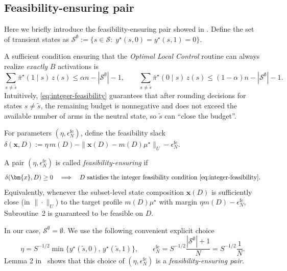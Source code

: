 \documentclass[mnsc,nonblindrev]{informs3}
\newcommand{\bmx}{\bm{x}}
\newcommand{\States}{\mathcal{S}}
\newcommand{\enfe}{\epsilon_N^{\mathrm{fe}}}
\begin{document}
\begin{APPENDICES}
\subsection{Feasibility-ensuring pair}
Here we briefly introduce the feasibility-ensuring pair showed in \citet{hong2024achieving}. Define the set of transient states as
$
\mathcal S^{\emptyset}:=\{s\in\mathcal S:\; y^\star(s,0)=y^\star(s,1)=0\}.
$

A sufficient condition ensuring that the \emph{Optimal Local Control} routine can always realize \emph{exactly} $B$ activations is
\begin{equation}\label{eq:integer-feasibility}
\sum_{s\neq \tilde s}\bar\pi^\star(1\mid s)\,z(s)\le \alpha n-|\mathcal S^{\emptyset}|-1,
\qquad
\sum_{s\neq \tilde s}\bar\pi^\star(0\mid s)\,z(s)\le (1-\alpha)n-|\mathcal S^{\emptyset}|-1.
\end{equation}
Intuitively, \eqref{eq:integer-feasibility} guarantees that after rounding decisions for states
$s\neq \tilde s$, the remaining budget is nonnegative and does not exceed the available number of arms in the neutral state, so $\tilde s$ can ``close the budget''.

For parameters $(\eta,\enfe)$, define the feasibility slack
$
    \delta(\bmx,D):=\eta\,m(D)-\|\bmx(D)-m(D)\mu^\star\|_U-\enfe.
$

\begin{definition}\label{def:fe-pair}
A pair $(\eta,\enfe)$ is called \emph{feasibility-ensuring} if 
\begin{equation*}%
    \delta(\bmx,D)\ge 0
    \quad\Longrightarrow\quad
    \text{$D$ satisfies the integer feasibility condition \eqref{eq:integer-feasibility}.}
\end{equation*}
Equivalently, whenever the subset-level state composition $\bmx(D)$ is sufficiently close (in $\|\cdot\|_U$)
to the target profile $m(D)\mu^\star$ with margin $\eta m(D)-\enfe$, Subroutine~2 is guaranteed
to be feasible on $D$.
\end{definition}
In our case, $\States^{\emptyset}=\emptyset$. We use the following convenient explicit choice 
\begin{equation}\label{eq:explicit-fe-pair}
\eta = S^{-1/2}\min\{y^\star(\tilde s,0),\,y^\star(\tilde s,1)\},
\qquad
\enfe = S^{-1/2}\frac{|\mathcal S^{\emptyset}|+1}{N}=S^{-1/2}\frac{1}{N}.
\end{equation}
Lemma 2 in~\citet{hong2024achieving} shows that this choice of $(\eta,\enfe)$ is a \emph{feasibility-ensuring pair}.



\end{APPENDICES}
\end{document}
